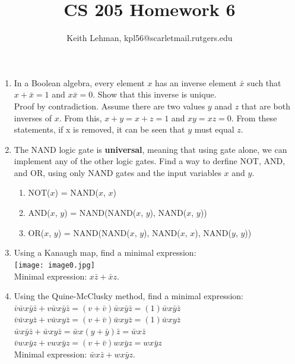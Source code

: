 \documentclass{article}
\title{CS 205 Homework 6}
\author{Keith Lehman, kpl56@scarletmail.rutgers.edu}
\begin{document}
\maketitle

\begin{enumerate}

\item In a Boolean algebra, every element $x$ has an inverse element $\bar{x}$ such that $x + \bar{x} = 1$ and $x \bar{x} = 0$. Show that this inverse is unique. \\
    Proof by contradiction. Assume there are two values $y$ anad $z$ that are both inverses of $x$. From this, $x + y = x + z = 1$ and $xy = xz = 0$. From these statements, if x is removed, it can be seen that $y$ must equal $z$. 

\item The NAND logic gate is \textbf{universal}, meaning that using gate alone, we can implement any of the other logic gates. Find a way to derfine NOT, AND, and OR, using only NAND gates and the input variables $x$ and $y$. \\
\begin{enumerate}
\item NOT($x$) = NAND($x$, $x$) 
\item AND($x$, $y$) = NAND(NAND($x$, $y$), NAND($x$, $y$))
\item OR($x$, $y$) = NAND(NAND($x$, $y$), NAND($x$, $x$), NAND($y$, $y$))
\end{enumerate}

\item Using a Kanaugh map, find a minimal expression: \\
\texttt{[image: image0.jpg]} \\
Minimal expression: $x \bar{z} + \bar{x} z$.

\item Using the Quine-McClusky method, find a minimal expression: \\
$\bar{v} \bar{w} x \bar{y}  \bar{z} + v \bar{w} x \bar{y}  \bar{z} = (v + \bar{v}) \bar{w} x \bar{y}  \bar{z} = (1) \bar{w} x \bar{y}  \bar{z}$\\
$\bar{v} \bar{w} x y  \bar{z} + v \bar{w} x y  \bar{z} = (v + \bar{v}) \bar{w} x y \bar{z} = (1) \bar{w} x y \bar{z}$\\
$\bar{w} x \bar{y} \bar{z} + \bar{w} x y \bar{z} = \bar{w} x (y + \bar{y}) \bar{z} = \bar{w} x \bar{z}$\\
$\bar{v} w x \bar{y} z + v w x \bar{y} z = (v + \bar{v}) w x \bar{y} z = w x \bar{y} z$ \\
Minimal expression: $\bar{w} x \bar{z} + w x \bar{y} z$.


\end{enumerate}
\end{document}
